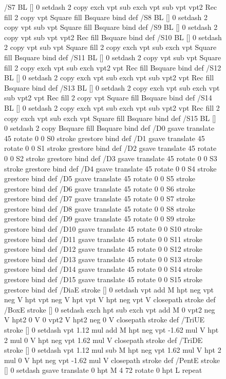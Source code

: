 \documentclass{LMCS}
\begin{document}
\begin{figure}[!tbp]
\begin{minipage}[b]{.47\linewidth}
{{{/S7 { BL [] 0 setdash 2 copy exch vpt sub exch vpt sub vpt vpt2 Rec fill
       2 copy vpt Square fill
       Bsquare } bind def
/S8 { BL [] 0 setdash 2 copy vpt sub vpt Square fill Bsquare } bind def
/S9 { BL [] 0 setdash 2 copy vpt sub vpt vpt2 Rec fill Bsquare } bind def
/S10 { BL [] 0 setdash 2 copy vpt sub vpt Square fill 2 copy exch vpt sub exch vpt Square fill
       Bsquare } bind def
/S11 { BL [] 0 setdash 2 copy vpt sub vpt Square fill 2 copy exch vpt sub exch vpt2 vpt Rec fill
       Bsquare } bind def
/S12 { BL [] 0 setdash 2 copy exch vpt sub exch vpt sub vpt2 vpt Rec fill Bsquare } bind def
/S13 { BL [] 0 setdash 2 copy exch vpt sub exch vpt sub vpt2 vpt Rec fill
       2 copy vpt Square fill Bsquare } bind def
/S14 { BL [] 0 setdash 2 copy exch vpt sub exch vpt sub vpt2 vpt Rec fill
       2 copy exch vpt sub exch vpt Square fill Bsquare } bind def
/S15 { BL [] 0 setdash 2 copy Bsquare fill Bsquare } bind def
/D0 { gsave translate 45 rotate 0 0 S0 stroke grestore } bind def
/D1 { gsave translate 45 rotate 0 0 S1 stroke grestore } bind def
/D2 { gsave translate 45 rotate 0 0 S2 stroke grestore } bind def
/D3 { gsave translate 45 rotate 0 0 S3 stroke grestore } bind def
/D4 { gsave translate 45 rotate 0 0 S4 stroke grestore } bind def
/D5 { gsave translate 45 rotate 0 0 S5 stroke grestore } bind def
/D6 { gsave translate 45 rotate 0 0 S6 stroke grestore } bind def
/D7 { gsave translate 45 rotate 0 0 S7 stroke grestore } bind def
/D8 { gsave translate 45 rotate 0 0 S8 stroke grestore } bind def
/D9 { gsave translate 45 rotate 0 0 S9 stroke grestore } bind def
/D10 { gsave translate 45 rotate 0 0 S10 stroke grestore } bind def
/D11 { gsave translate 45 rotate 0 0 S11 stroke grestore } bind def
/D12 { gsave translate 45 rotate 0 0 S12 stroke grestore } bind def
/D13 { gsave translate 45 rotate 0 0 S13 stroke grestore } bind def
/D14 { gsave translate 45 rotate 0 0 S14 stroke grestore } bind def
/D15 { gsave translate 45 rotate 0 0 S15 stroke grestore } bind def
/DiaE { stroke [] 0 setdash vpt add M
  hpt neg vpt neg V hpt vpt neg V
  hpt vpt V hpt neg vpt V closepath stroke } def
/BoxE { stroke [] 0 setdash exch hpt sub exch vpt add M
  0 vpt2 neg V hpt2 0 V 0 vpt2 V
  hpt2 neg 0 V closepath stroke } def
/TriUE { stroke [] 0 setdash vpt 1.12 mul add M
  hpt neg vpt -1.62 mul V
  hpt 2 mul 0 V
  hpt neg vpt 1.62 mul V closepath stroke } def
/TriDE { stroke [] 0 setdash vpt 1.12 mul sub M
  hpt neg vpt 1.62 mul V
  hpt 2 mul 0 V
  hpt neg vpt -1.62 mul V closepath stroke } def
/PentE { stroke [] 0 setdash gsave
  translate 0 hpt M 4 {72 rotate 0 hpt L} repeat
}}}}
\end{minipage}
\end{figure}
\end{document}

